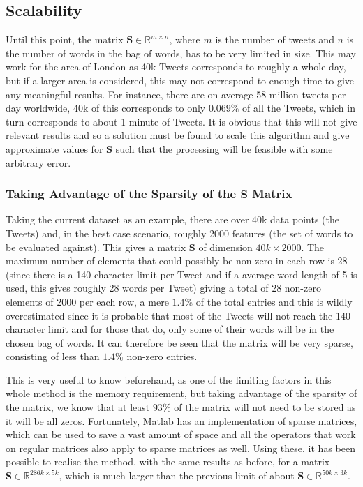 \documentclass[11pt,a4paper]{article}
\begin{document}
\subsection{Scalability}
Until this point, the matrix $\mathbf{S} \in \mathbb{R}^{m \times n}$, where $m$ is the number of tweets and $n$ is the number of words in the bag of words, has to be very limited in size. This may work for the area of London as 40k Tweets corresponds to roughly a whole day, but if a larger area is considered, this may not correspond to enough time to give any meaningful results. For instance,  there are on average 58 million tweets per day worldwide,\cite{statbrain} 40k of this corresponds to only $0.069\%$ of all the Tweets, which in turn corresponds to about 1 minute of Tweets. It is obvious that this will not give relevant results and so a solution must be found to scale this algorithm and give approximate values for $\mathbf{S}$ such that the processing will be feasible with some arbitrary error. 

\subsubsection{Taking Advantage of the Sparsity of the $\mathbf{S}$ Matrix}

Taking the current dataset as an example, there are over 40k data points (the Tweets) and, in the best case scenario, roughly 2000 features (the set of words to be evaluated against). This gives a matrix $\mathbf{S}$ of dimension $40k\times 2000$. 
The maximum number of elements that could possibly be non-zero in each row is 28 (since there is a 140 character limit per Tweet and if a average word length of 5 is used, this gives roughly 28 words per Tweet) giving a total of 28 non-zero elements of 2000 per each row, a mere $1.4\%$ of the total entries and this is wildly overestimated since it is probable that most of the Tweets will not reach the 140 character limit and for those that do, only some of their words will be in the chosen bag of words. It can therefore be seen that the matrix will be very sparse, consisting of less than $1.4\%$ non-zero entries.

This is very useful to know beforehand, as one of the limiting factors in this whole method is the memory requirement, but taking advantage of the sparsity of the matrix, we know that at least $93\%$ of the matrix will not need to be stored as it will be all zeros. Fortunately, Matlab has an implementation of sparse matrices, which can be used to save a vast amount of space and all the operators that work on regular matrices also apply to sparse matrices as well. Using these, it has been possible to realise the method, with the same results as before, for a matrix $\mathbf{S} \in \mathbb{R}^{286k\times5k}$, which is much larger than the previous limit of about $\mathbf{S} \in \mathbb{R}^{50k\times3k}$.
\end{document}
